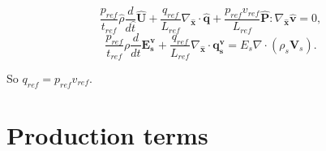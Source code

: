 \documentclass[a4paper,11pt,english]{article}
\begin{document}
\begin{equation}
     \frac{p_{ref}}{t_{ref}} \hat{\rho} \frac{d}{d\hat{t}}\hat{\mathbf{U}} + \frac{q_{ref}}{L_{ref}} \nabla_{\hat{\mathbf{x}}} \cdot \hat{\mathbf{q}} + \frac{p_{ref}v_{ref}}{L_{ref}} \hat{\mathbf{P}} : \nabla_{\hat{\mathbf{x}}} \hat{\mathbf{v}} = 0,
\end{equation}
\begin{equation}
     \frac{p_{ref}}{t_{ref}} \rho \frac{d}{dt}\mathbf{E^v_s} + \frac{q_{ref}}{L_{ref}} \nabla_{\hat{\mathbf{x}}} \cdot \mathbf{q^v_s} = E_s \nabla \cdot (\rho_s \mathbf{V}_s).
\end{equation}

So $q_{ref} = p_{ref}v_{ref}$.

\section{Production terms}
\end{document}

